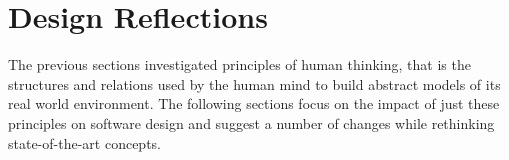 %
%
%
%
%
%
%

\section{Design Reflections}
\label{design_reflections_heading}

The previous sections investigated principles of human thinking, that is the
structures and relations used by the human mind to build abstract models of its
real world environment. The following sections focus on the impact of just
these principles on software design and suggest a number of changes while
rethinking state-of-the-art concepts.









